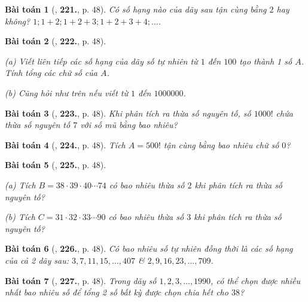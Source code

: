 \documentclass{article}
\numberwithin{equation}{section}
\newtheorem{baitoan}{Bài toán}[section]
\begin{document}
\begin{baitoan}[\cite{Binh_Toan_6_tap_1}, \textbf{221.}, p. 48]
	Có số hạng nào của dãy sau tận cùng bằng $2$ hay không? $1; 1 + 2; 1 + 2 + 3; 1 + 2 + 3 + 4;\ldots$.
\end{baitoan}

\begin{baitoan}[\cite{Binh_Toan_6_tap_1}, \textbf{222.}, p. 48]
	\begin{enumerate*}
		\item[(a)] Viết liên tiếp các số hạng của dãy số tự nhiên từ $1$ đến $100$ tạo thành 1 số $A$. Tính tổng các chữ số của $A$.
		\item[(b)] Cũng hỏi như trên nếu viết từ $1$ đến $1000000$.
	\end{enumerate*}
\end{baitoan}

\begin{baitoan}[\cite{Binh_Toan_6_tap_1}, \textbf{223.}, p. 48]
	Khi phân tích ra thừa số nguyên tố, số $1000!$ chứa thừa số nguyên tố $7$ với số mũ bằng bao nhiêu?
\end{baitoan}

\begin{baitoan}[\cite{Binh_Toan_6_tap_1}, \textbf{224.}, p. 48]
	Tích $A = 500!$ tận cùng bằng bao nhiêu chữ số $0$?
\end{baitoan}

\begin{baitoan}[\cite{Binh_Toan_6_tap_1}, \textbf{225.}, p. 48]
	\begin{enumerate*}
		\item[(a)] Tích $B = 38\cdot 39\cdot 40\cdots 74$ có bao nhiêu thừa số $2$ khi phân tích ra thừa số nguyên tố?
		\item[(b)] Tích $C = 31\cdot 32\cdot 33\cdots 90$ có bao nhiêu thừa số $3$ khi phân tích ra thừa số nguyên tố?
	\end{enumerate*}
\end{baitoan}

\begin{baitoan}[\cite{Binh_Toan_6_tap_1}, \textbf{226.}, p. 48]
	Có bao nhiêu số tự nhiên đồng thời là các số hạng của cả 2 dãy sau: $3,7,11,15,\ldots,407$ \& $2,9,16,23,\ldots,709$.
\end{baitoan}

\begin{baitoan}[\cite{Binh_Toan_6_tap_1}, \textbf{227.}, p. 48]
	Trong dãy số $1,2,3,\ldots,1990$, có thể chọn được nhiều nhất bao nhiêu số để tổng 2 số bất kỳ được chọn chia hết cho $38$?
\end{baitoan}
\end{document}
